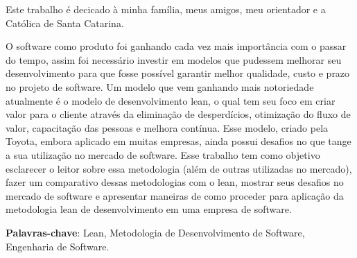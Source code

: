 \begin{agradecimentos}

Este trabalho é decicado à minha família, meus amigos, meu orientador e a Católica de Santa Catarina. 

\end{agradecimentos}




\setlength{\absparsep}{18pt} 
\begin{resumo}
O software como produto foi ganhando cada vez mais importância com o passar do tempo, assim foi necessário investir em modelos que pudessem melhorar seu desenvolvimento para que fosse possível garantir melhor qualidade, custo e prazo no projeto de software. Um modelo que vem ganhando mais notoriedade atualmente é o modelo de desenvolvimento lean, o qual tem seu foco em criar valor para o cliente através da eliminação de desperdícios, otimização do fluxo de valor, capacitação das pessoas e melhora contínua. Esse modelo, criado pela Toyota, embora aplicado em muitas empresas, ainda possui desafios no que tange a sua utilização no mercado de software. Esse trabalho tem como objetivo esclarecer o leitor sobre essa metodologia (além de outras utilizadas no mercado), fazer um comparativo dessas metodologias com o lean, mostrar seus desafios no mercado de software e apresentar maneiras de como proceder para aplicação da metodologia lean de desenvolvimento em uma empresa de software.

\textbf{Palavras-chave}: Lean, Metodologia de Desenvolvimento de Software, Engenharia de Software. %

\end{resumo}
 

